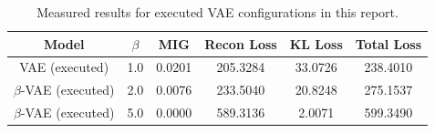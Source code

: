 \begin{table}[H]
\centering
\begin{tabular}{@{}cccccc@{}}
\toprule
\textbf{Model} & \textbf{$\beta$} & \textbf{MIG} & \textbf{Recon Loss} & \textbf{KL Loss} & \textbf{Total Loss} \\ \midrule
VAE (executed) & 1.0 & 0.0201 & 205.3284 & 33.0726 & 238.4010 \\
$\beta$-VAE (executed) & 2.0 & 0.0076 & 233.5040 & 20.8248 & 275.1537 \\
$\beta$-VAE (executed) & 5.0 & 0.0000 & 589.3136 & 2.0071 & 599.3490 \\
\bottomrule
\end{tabular}
\caption{Measured results for executed VAE configurations in this report.}
\label{tab:comprehensive_results}
\end{table}
